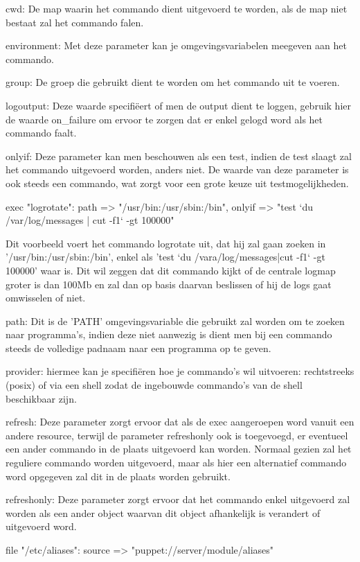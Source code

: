 		cwd:
		De map waarin het commando dient uitgevoerd te worden, als de map niet bestaat zal het commando falen.

		environment:
		Met deze parameter kan je omgevingsvariabelen meegeven aan het commando.

		group:
		De groep die gebruikt dient te worden om het commando uit te voeren.

		logoutput:
		Deze waarde specifiëert of men de output dient te loggen, gebruik hier de waarde on_failure om ervoor te zorgen dat er enkel gelogd word als het commando faalt.

		onlyif:
		Deze parameter kan men beschouwen als een test, indien de test slaagt zal het commando uitgevoerd worden, anders niet.
		De waarde van deze parameter is ook steeds een commando, wat zorgt voor een grote keuze uit testmogelijkheden.

			exec { "logrotate":
				path => "/usr/bin:/usr/sbin:/bin",
				onlyif => "test `du /var/log/messages | cut -f1` -gt 100000"
			}

		Dit voorbeeld voert het commando logrotate uit, dat hij zal gaan zoeken in '/usr/bin:/usr/sbin:/bin', enkel als 'test `du /vara/log/messages|cut -f1` -gt 100000' waar is.
		Dit wil zeggen dat dit commando kijkt of de centrale logmap groter is dan 100Mb en zal dan op basis daarvan beslissen of hij de logs gaat omwisselen of niet.

		path:
		Dit is de 'PATH' omgevingsvariable die gebruikt zal worden om te zoeken naar programma's, indien deze niet aanwezig is dient men bij een commando steeds de volledige padnaam naar een programma op te geven.

		provider:
		hiermee kan je specifiëren hoe je commando's wil uitvoeren: rechtstreeks (posix) of via een shell zodat de ingebouwde commando's van de shell beschikbaar zijn.

		refresh:
		Deze parameter zorgt ervoor dat als de exec aangeroepen word vanuit een andere resource, terwijl de parameter refreshonly ook is toegevoegd, er eventueel een ander commando in de plaats uitgevoerd kan worden.
		Normaal gezien zal het reguliere commando worden uitgevoerd, maar als hier een alternatief commando word opgegeven zal dit in de plaats worden gebruikt.

		refreshonly:
		Deze parameter zorgt ervoor dat het commando enkel uitgevoerd zal worden als een ander object waarvan dit object afhankelijk is verandert of uitgevoerd word.

			file { "/etc/aliases":
				source => "puppet://server/module/aliases"
			}

